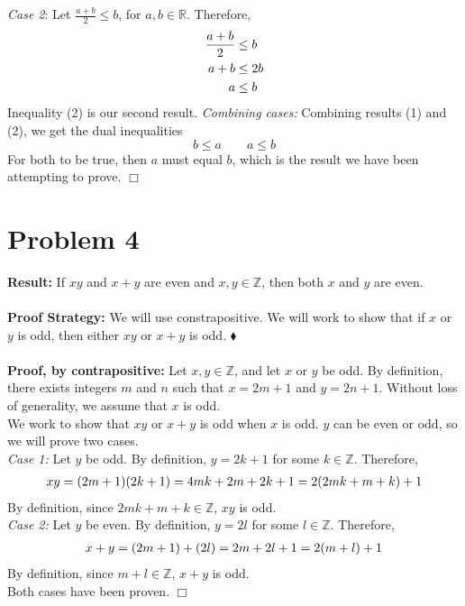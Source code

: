 \documentclass[11pt]{article}
\begin{document}
     \textit{Case 2}: Let $\frac{a+b}{2} \leq b$, for $a, b \in \mathbb{R}$. Therefore, 
    \begin{align}
        \frac{a+b}{2} & \le b \notag \\
        a+b & \le 2b \notag \\
        a & \le b \label{ineq2}
    \end{align}
    Inequality (2) is our second result.
    \textit{Combining cases:} Combining results (1) and (2), we get the dual inequalities 
    $$
        b \leq a \qquad a \leq b
    $$
    For both to be true, then $a$ must equal $b$, which is the result we have been attempting to prove. \hfill $\Box$

\newpage


\section*{Problem 4}

    \textbf{Result:} If $xy$ and $x+y$ are even and $x, y \in \mathbb{Z}$, then both $x$ and $y$ are even.\\
    \\
    \textbf{Proof Strategy:} We will use constrapositive. We will work to show that if $x$ or $y$ is odd, then either $xy$ or $x+y$ is odd. \hfill $\blacklozenge$\\
    \\
    \textbf{Proof, by contrapositive:} Let $x, y \in \mathbb{Z}$, and let $x$ or $y$ be odd. By definition, there exists integers $m$ and $n$ such that $x=2m+1$ and $y=2n+1$. Without loss of generality, we assume that $x$ is odd.\\
    We work to show that $xy$ or $x+y$ is odd when $x$ is odd. $y$ can be even or odd, so we will prove two cases.\\
    \textit{Case 1:} Let $y$ be odd. By definition, $y = 2k+1$ for some $k \in \mathbb{Z}$. Therefore, 
    \begin{align}
        xy = (2m+1)(2k+1) = 4mk+2m+2k+1 = 2(2mk+m+k)+1 \notag
    \end{align}
    By definition, since $2mk+m+k \in \mathbb{Z}$, $xy$ is odd. \\
    \textit{Case 2:} Let $y$ be even. By definition, $y = 2l$ for some $l \in \mathbb{Z}$. Therefore, 
    \begin{align}
        x+y = (2m+1)+(2l) = 2m+2l+1= 2(m+l)+1 \notag
    \end{align}
    By definition, since $m+l \in \mathbb{Z}$, $x+y$ is odd.\\
    Both cases have been proven. \hfill $\Box$
\end{document}

